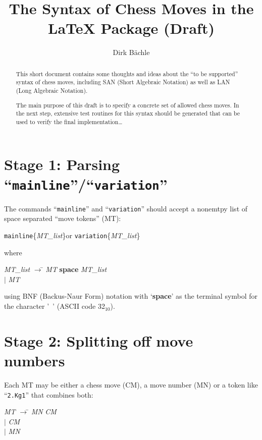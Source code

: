 \documentclass[a4paper]{article}
\title{The Syntax of Chess Moves in the \LaTeX{} Package \package{skak} (Draft)}
\author{Dirk B\"achle}
\def\command#1{``\texttt{\symbol{92}#1}''}
\def\commandwarg#1#2{\texttt{\symbol{92}#1}\{\textit{#2}\}}
\def\base#1{$_{\scriptscriptstyle #1}$}
\def\abbrev#1{\textsf{#1}}
\def\bnf#1{\textit{#1}}
\def\bnfterm#1{\textbf{#1}}
\def\bnfprod{$\rightarrow$}
\def\bnfor{$|$}
\begin{document}
\maketitle

\begin{abstract}
This short document contains some thoughts and ideas about the ``to be supported''
syntax of chess moves, including SAN (Short Algebraic Notation) as well as LAN
(Long Algebraic Notation). 

The main purpose of this draft is to specify a concrete set of allowed chess moves.
In the next step, extensive test routines for this syntax should be generated
that can be used to verify the final implementation\ldots
\end{abstract}

\section*{Stage 1: Parsing \command{mainline}/\command{variation}}

The commands \command{mainline} and \command{variation} should accept
a nonemtpy list of space separated ``move tokens'' (\abbrev{MT}):

\medskip
\hfil\commandwarg{mainline}{MT\_list}\hfil or \hfil\commandwarg{variation}{MT\_list}\hfil

where

\begin{center}
\begin{minipage}{3cm}
\begin{tabbing}
\bnf{MT\_list} \bnfprod\={} \bnf{MT} \bnfterm{space} \bnf{MT\_list}\\
 \>\bnfor{} \bnf{MT}
\end{tabbing}
\end{minipage}
\end{center}

using BNF (Backus-Naur Form) notation with `\bnfterm{space}' as the
terminal symbol for the character '\ ' (ASCII code 
32\base{10}).

\section*{Stage 2: Splitting off move numbers}

Each \abbrev{MT} may be either a chess move (\abbrev{CM}), a move number (\abbrev{MN})
or a token like ``\texttt{2.Kg1}'' that combines both:

\begin{center}
\begin{minipage}{3cm}
\begin{tabbing}
\bnf{MT} \bnfprod\={} \bnf{MN} \bnf{CM}\\
 \>\bnfor{} \bnf{CM}\\
 \>\bnfor{} \bnf{MN}
\end{tabbing}
\end{minipage}
\end{center}
\end{document}
